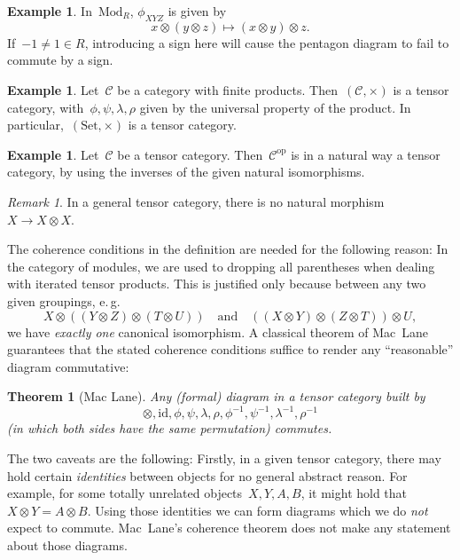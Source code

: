 \documentclass[a4paper,english,12pt]{scrartcl}
\theoremstyle{definition}
\newtheorem{ex}[defn]{Example}
\theoremstyle{plain}
\newtheorem{thm}[defn]{Theorem}
\theoremstyle{remark}
\newtheorem{rem}[defn]{Remark}
\newcommand{\C}{\mathcal{C}}
\newcommand{\id}{\mathrm{id}}
\newcommand{\op}{\mathrm{op}}
\renewcommand{\_}{\mathpunct{.}\,}
\newcommand{\?}{\,{:}\,}
\newcommand{\Mod}{\mathrm{Mod}}
\newcommand{\Set}{\mathrm{Set}}
\begin{document}
\begin{ex}In~$\Mod_R$, $\phi_{XYZ}$ is given by
\[ x \otimes (y \otimes z) \longmapsto (x \otimes y) \otimes z. \]
If~$-1 \neq 1 \in R$, introducing a sign here will cause the pentagon diagram
to fail to commute by a sign.\end{ex}

\begin{ex}Let~$\C$ be a category with finite products. Then~$(\C,\times)$ is a
tensor category, with~$\phi, \psi, \lambda, \rho$ given by the universal
property of the product. In particular,~$(\Set,\times)$ is a tensor
category.\end{ex}

\begin{ex}Let~$\C$ be a tensor category. Then~$\C^\op$ is in a natural way a
tensor category, by using the inverses of the given natural
isomorphisms.\end{ex}

\begin{rem}In a general tensor category, there is no natural morphism~$X \to X
\otimes X$.\end{rem}

The coherence conditions in the definition are needed for the following reason:
In the category of modules, we are used to dropping all parentheses when
dealing with iterated tensor products. This is justified only because between any
two given groupings, e.\,g.
\[ X \otimes ((Y \otimes Z) \otimes (T \otimes U)) \quad\text{and}\quad
  ((X \otimes Y) \otimes (Z \otimes T)) \otimes U, \]
we have \emph{exactly one} canonical isomorphism. A classical theorem of Mac~Lane
guarantees that the stated coherence conditions suffice to render any
``reasonable'' diagram commutative:

\begin{thm}[Mac Lane]Any (formal) diagram in a tensor category built
by \[
\otimes,\id,\phi,\psi,\lambda,\rho,\phi^{-1},\psi^{-1},\lambda^{-1},\rho^{-1}
\]
(in which both sides have the same permutation) commutes.\end{thm}

The two caveats are the following: Firstly, in a given tensor category, there
may hold certain \emph{identities} between objects for no general abstract
reason. For example, for some totally unrelated objects~$X,Y,A,B$, it might
hold that $X \otimes Y = A \otimes B$. Using those identities we can form
diagrams which we do \emph{not} expect to commute. Mac~Lane's coherence theorem
does not make any statement about those diagrams.
\end{document}
